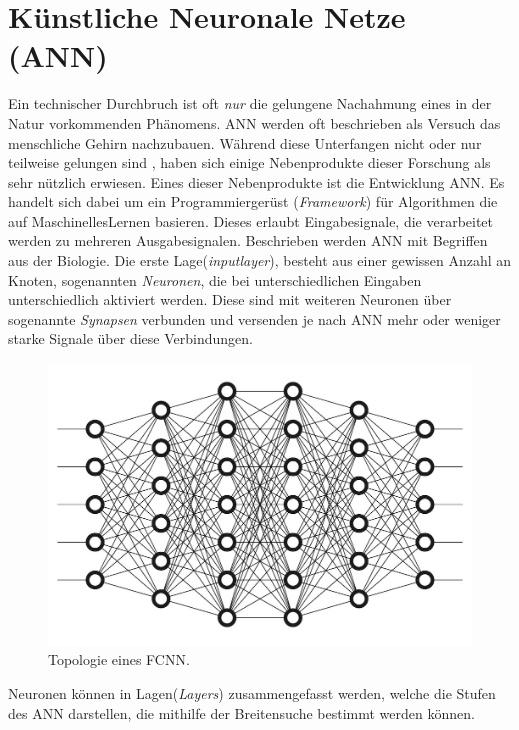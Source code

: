\documentclass{thesisclass}
\begin{document}
\section{Künstliche Neuronale Netze (\gls{ANN})}
Ein technischer Durchbruch ist oft \textit{nur} die gelungene Nachahmung eines in der Natur vorkommenden Phänomens. \gls{ANN} werden oft beschrieben als Versuch das menschliche Gehirn nachzubauen. Während diese Unterfangen nicht oder nur teilweise gelungen sind \cite{Adan2018Oct}, haben sich einige Nebenprodukte dieser Forschung als sehr nützlich erwiesen.
Eines dieser Nebenprodukte ist die Entwicklung \gls{ANN}. Es handelt sich dabei um ein Programmiergerüst (\textit{Framework}) für Algorithmen die auf \gls{MaschinellesLernen} basieren. Dieses erlaubt Eingabesignale, die verarbeitet werden zu mehreren Ausgabesignalen. Beschrieben werden \gls{ANN} mit Begriffen aus der Biologie. Die erste Lage(\textit{inputlayer}), besteht aus einer gewissen Anzahl an Knoten, sogenannten \textit{Neuronen}, die bei unterschiedlichen Eingaben unterschiedlich aktiviert werden. Diese sind mit weiteren Neuronen über sogenannte \textit{Synapsen} verbunden und versenden je nach \gls{ANN} mehr oder weniger starke Signale über diese Verbindungen.
\begin{figure}[H]
  		\includegraphics[width=\linewidth]{images/DeepNeuralNetwork.jpg}
  		\caption{Topologie eines \gls{FCNN}. 	\cite{NeuronalesNetzImage} }
  		\label{fig:Neuronales Netz}
\end{figure}

Neuronen können in Lagen(\textit{Layers}) zusammengefasst werden, welche die Stufen des \gls{ANN} darstellen, die mithilfe der Breitensuche bestimmt werden können.
\end{document}
